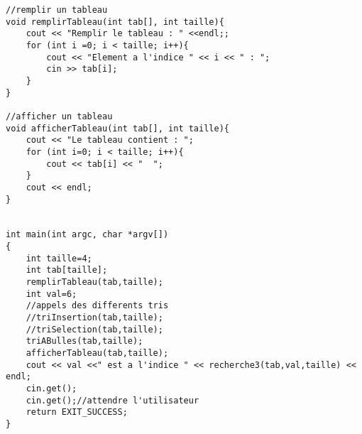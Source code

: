 \documentclass[french]{article}
\begin{document}
	\begin{lstlisting}[caption={Sous programmes supplémentaires}]
//remplir un tableau
void remplirTableau(int tab[], int taille){
    cout << "Remplir le tableau : " <<endl;;
    for (int i =0; i < taille; i++){
        cout << "Element a l'indice " << i << " : ";
        cin >> tab[i];
    }
}

//afficher un tableau
void afficherTableau(int tab[], int taille){
    cout << "Le tableau contient : ";
    for (int i=0; i < taille; i++){
        cout << tab[i] << "  ";
    }
    cout << endl;
}


int main(int argc, char *argv[])
{
    int taille=4;
    int tab[taille];
    remplirTableau(tab,taille);
    int val=6;
    //appels des differents tris
    //triInsertion(tab,taille);
    //triSelection(tab,taille);
    triABulles(tab,taille);
    afficherTableau(tab,taille);
    cout << val <<" est a l'indice " << recherche3(tab,val,taille) << endl;  
    cin.get();
    cin.get();//attendre l'utilisateur
    return EXIT_SUCCESS;
}
	\end{lstlisting}
\end{document}
